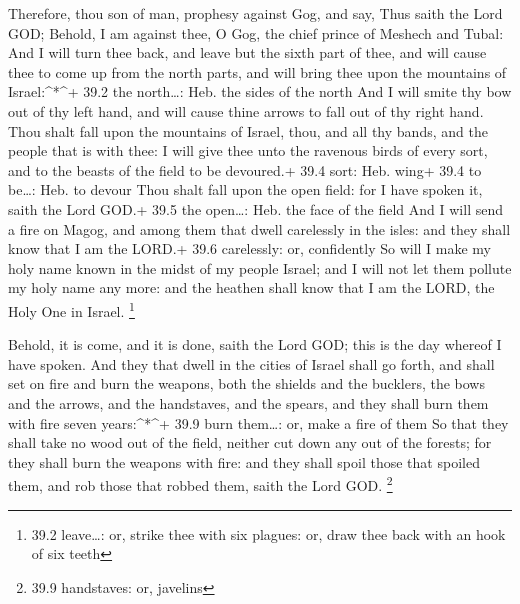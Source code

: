  Therefore, thou son of man, prophesy against Gog, and say,
Thus saith the Lord GOD; Behold, I am against thee, O Gog, the chief
prince of Meshech and Tubal:  And I will turn thee back, and
leave but the sixth part of thee, and will cause thee to come up from
the north parts, and will bring thee upon the mountains of
Israel:\^{}*\^{}+ 39.2 the north\ldots: Heb. the sides of the north
 And I will smite thy bow out of thy left hand, and will
cause thine arrows to fall out of thy right hand.  Thou
shalt fall upon the mountains of Israel, thou, and all thy bands, and
the people that is with thee: I will give thee unto the ravenous birds
of every sort, and to the beasts of the field to be devoured.+ 39.4
sort: Heb. wing+ 39.4 to be\ldots: Heb. to devour  Thou
shalt fall upon the open field: for I have spoken it, saith the Lord
GOD.+ 39.5 the open\ldots: Heb. the face of the field  And I
will send a fire on Magog, and among them that dwell carelessly in the
isles: and they shall know that I am the LORD.+ 39.6 carelessly: or,
confidently  So will I make my holy name known in the midst
of my people Israel; and I will not let them pollute my holy name any
more: and the heathen shall know that I am the LORD, the Holy One in
Israel. \footnote{39.2 leave\ldots: or, strike thee with six plagues:
  or, draw thee back with an hook of six teeth}

 Behold, it is come, and it is done, saith the Lord GOD;
this is the day whereof I have spoken.  And they that dwell
in the cities of Israel shall go forth, and shall set on fire and burn
the weapons, both the shields and the bucklers, the bows and the arrows,
and the handstaves, and the spears, and they shall burn them with fire
seven years:\^{}*\^{}+ 39.9 burn them\ldots: or, make a fire of them
 So that they shall take no wood out of the field, neither
cut down any out of the forests; for they shall burn the weapons with
fire: and they shall spoil those that spoiled them, and rob those that
robbed them, saith the Lord GOD. \footnote{39.9 handstaves: or, javelins}

